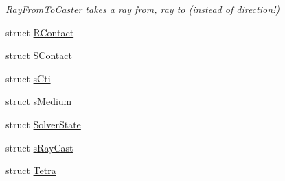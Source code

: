 \begin{DoxyCompactItemize}
\begin{DoxyCompactList}\small\item\em \hyperlink{structbt_soft_body_1_1_ray_from_to_caster}{Ray\+From\+To\+Caster} takes a ray from, ray to (instead of direction!) \end{DoxyCompactList}\item 
struct \hyperlink{structbt_soft_body_1_1_r_contact}{R\+Contact}
\item 
struct \hyperlink{structbt_soft_body_1_1_s_contact}{S\+Contact}
\item 
struct \hyperlink{structbt_soft_body_1_1s_cti}{s\+Cti}
\item 
struct \hyperlink{structbt_soft_body_1_1s_medium}{s\+Medium}
\item 
struct \hyperlink{structbt_soft_body_1_1_solver_state}{Solver\+State}
\item 
struct \hyperlink{structbt_soft_body_1_1s_ray_cast}{s\+Ray\+Cast}
\item 
struct \hyperlink{structbt_soft_body_1_1_tetra}{Tetra}
\end{DoxyCompactItemize}
